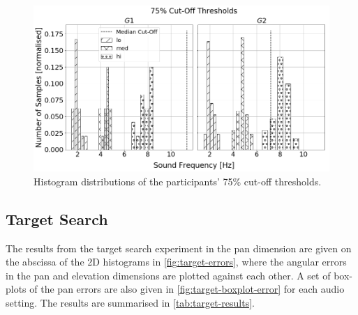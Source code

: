 \documentclass{article}
\begin{document}
\begin{figure}
  \centering
  \includegraphics[width=1.0\textwidth]{figures/pitch_thresholds_limits.png}
  \caption{Histogram distributions of the participants' 75\% cut-off thresholds. }\label{fig:pitch-thresholds-hist}
\end{figure}

\subsection{Target Search}

The results from the target search experiment in the pan dimension are given on the abscissa of the 2D histograms in \cref{fig:target-errors}, where the angular errors in the pan and elevation dimensions are plotted against each other. 
A set of box-plots of the pan errors are also given in \cref{fig:target-boxplot-error} for each audio setting.
The results are summarised in \cref{tab:target-results}.
\end{document}
